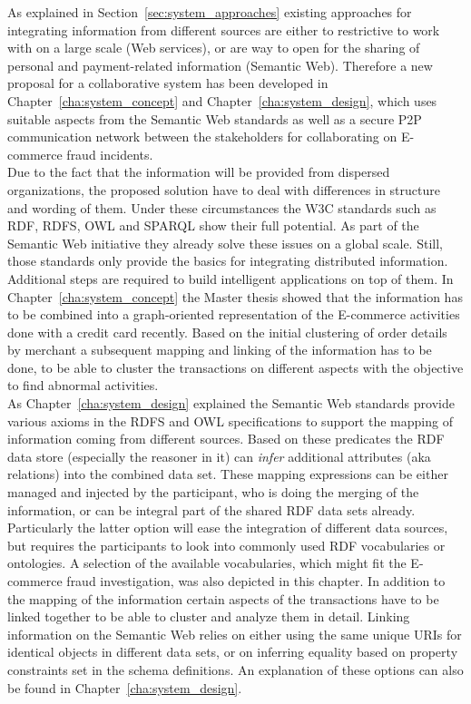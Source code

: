 As explained in Section~\ref{sec:system_approaches} existing approaches for integrating information from different sources are either to restrictive to work with on a large scale (Web services), or are way to open for the sharing of personal and payment-related information (Semantic Web). Therefore a new proposal for a collaborative system has been developed in Chapter~\ref{cha:system_concept} and Chapter~\ref{cha:system_design}, which uses suitable aspects from the Semantic Web standards as well as a secure \gls{P2P} communication network between the stakeholders for collaborating on \gls{E-commerce} fraud incidents. \\

Due to the fact that the information will be provided from dispersed organizations, the proposed solution have to deal with differences in structure and wording of them. Under these circumstances the \gls{W3C} standards such as \gls{RDF}, \gls{RDFS}, \gls{OWL} and \gls{SPARQL} show their full potential. As part of the Semantic Web initiative they already solve these issues on a global scale. Still, those standards only provide the basics for integrating distributed information. Additional steps are required to build intelligent applications on top of them. In Chapter~\ref{cha:system_concept} the Master thesis showed that the information has to be combined into a graph-oriented representation of the \gls{E-commerce} activities done with a credit card recently. Based on the initial clustering of order details by merchant a subsequent mapping and linking of the information has to be done, to be able to cluster the transactions on different aspects with the objective to find abnormal activities. \\

As Chapter~\ref{cha:system_design} explained the Semantic Web standards provide various axioms in the \gls{RDFS} and \gls{OWL} specifications to support the mapping of information coming from different sources. Based on these predicates the \gls{RDF} data store (especially the reasoner in it) can \emph{infer} additional attributes (aka relations) into the combined data set. These mapping expressions can be either managed and injected by the participant, who is doing the merging of the information, or can be integral part of the shared \gls{RDF} data sets already. Particularly the latter option will ease the integration of different data sources, but requires the participants to look into commonly used \gls{RDF} vocabularies or ontologies. A selection of the available vocabularies, which might fit the \gls{E-commerce} fraud investigation, was also depicted in this chapter. In addition to the mapping of the information certain aspects of the transactions have to be linked together to be able to cluster and analyze them in detail. Linking information on the Semantic Web relies on either using the same unique \gls{URI}s for identical objects in different data sets, or on inferring equality based on property constraints set in the schema definitions. An explanation of these options can also be found in Chapter~\ref{cha:system_design}. \\

